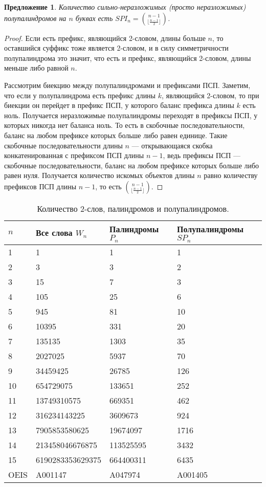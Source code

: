 \documentclass[a4paper,fleqn,12pt,top=0pt]{article}
\theoremstyle{plain}
\newtheorem{proposition}[theorem]{Предложение}
\theoremstyle{definition}
\theoremstyle{remark}
\begin{document}
\begin{proposition}
    Количество сильно-неразложимых (просто неразложимых) полупалиндромов на $n$ буквах есть $SPI_n = \binom{n-1}{\lfloor \frac{n-1}{2} \rfloor}$.
\end{proposition}
\begin{proof}
    Если есть префикс, являющийся 2-словом, длины больше $n$, то оставшийся суффикс тоже является 2-словом, и в силу симметричности полупалиндрома это значит, что есть и префикс, являющийся 2-словом, длины меньше либо равной $n$. 

    Рассмотрим биекцию между полупалиндромами и префиксами ПСП. Заметим, что если у полупалиндрома есть префикс длины $k$, являющийся 2-словом, то при биекции он перейдет в префикс ПСП, у которого баланс префикса длины $k$ есть ноль. Получается неразложимые полупалиндромы переходят в префиксы ПСП, у которых никогда нет баланса ноль. То есть в скобочные последовательности, баланс на любом префиксе которых больше либо равен единице. Такие скобочные последовательности длины $n$ --- открывающаяся скобка конкатенированная с префиксом ПСП длины $n - 1$, ведь префиксы ПСП --- скобочные последовательности, баланс на любом префиксе которых больше либо равен нуля. Получается количество искомых объектов длины $n$ равно количеству префиксов ПСП длины $n - 1$, то есть $\binom{n-1}{\lfloor \frac{n-1}{2} \rfloor}$.
\end{proof}

\begin{table}
    \centering
    \begin{tabular}{|l|l|l|l|}
\hline
$n$ & Все слова $W_n$ & Палиндромы $P_n$ & Полупалиндромы $SP_n$ \\
\hline
1 & 1 & 1 & 1 \\
2 & 3 & 3 & 2 \\
3 & 15 & 7 & 3 \\
4 & 105 & 25 & 6 \\
5 & 945 & 81 & 10 \\
6 & 10395 & 331 & 20 \\
7 & 135135 & 1303 & 35 \\
8 & 2027025 & 5937 & 70 \\
9 & 34459425 & 26785 & 126 \\
10 & 654729075 & 133651 & 252 \\
11 & 13749310575 & 669351 & 462 \\
12 & 316234143225 & 3609673 & 924 \\
13 & 7905853580625 & 19674097 & 1716 \\
14 & 213458046676875 & 113525595 & 3432 \\
15 & 6190283353629375 & 664400311 & 6435 \\
\hline
OEIS\cite{oeis} & A001147 & A047974 & A001405 \\
\hline
    \end{tabular}
    \caption{Количество 2-слов, палиндромов и полупалиндромов.}
\end{table}
\end{document}
